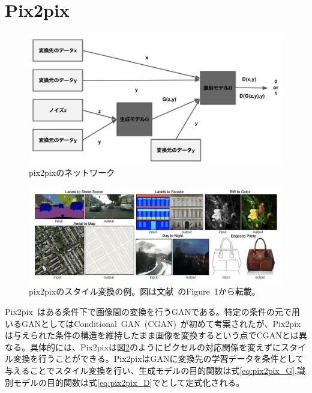 \section{Pix2pix}

\begin{figure}[t]
\begin{center}
\includegraphics[width=\hsize]{figure/pix2pix_net.png}
\caption{pix2pixのネットワーク}
\label{fig:pix2pix_net}
\end{center}
\end{figure}

\begin{figure}[t]
\begin{center}
\includegraphics[width=\hsize]{figure/pix2pix_img.png}
\caption{pix2pixのスタイル変換の例。図は文献~\cite{pix2pix}のFigure~1から転載。}
\label{fig:pix2pix_img}
\end{center}
\end{figure}

Pix2pix~\cite{pix2pix}はある条件下で画像間の変換を行うGANである。特定の条件の元で用いるGANとしてはConditional~GAN~(CGAN)~\cite{CGAN}が初めて考案されたが、Pix2pixは与えられた条件の構造を維持したまま画像を変換するという点でCGANとは異なる。具体的には、Pix2pixは図\ref{fig:pix2pix_img}のようにピクセルの対応関係を変えずにスタイル変換を行うことができる。Pix2pixはGANに変換先の学習データを条件として与えることでスタイル変換を行い、生成モデルの目的関数は式\ref{eq:pix2pix_G},識別モデルの目的関数は式\ref{eq:pix2pix_D}でとして定式化される。

